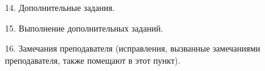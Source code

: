 \documentclass[12pt]{article}
\begin{document}
\begin{flushleft}
    14. Дополнительные задания. \\
\end{flushleft}

\begin{flushleft}
    15. Выполнение дополнительных заданий. \\
\end{flushleft}

\begin{flushleft}
    16. Замечания преподавателя (исправления, вызванные замечаниями преподавателя, также помещают в этот пункт). \\
\end{flushleft}
\end{document}
